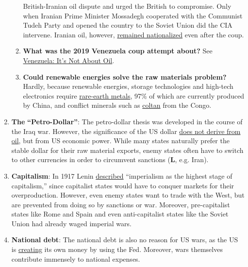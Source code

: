 \begin{enumerate}
\begin{enumerate}
    British-Iranian oil dispute and urged the British to compromise.
    Only when Iranian Prime Minister Mossadegh cooperated with the
    Communist Tudeh Party and opened the country to the Soviet Union did
    the CIA intervene. Iranian oil, however,
    \href{https://www.nationalreview.com/2015/07/what-really-happened-shahs-iran/}{remained
    nationalized} even after the coup.
  \item
    \textbf{What was the 2019 Venezuela coup attempt about?} See
    \href{https://swprs.org/venezuela-its-not-about-the-oil/}{Venezuela:
    It's Not About Oil}.
  \item
    \textbf{Could renewable energies solve the raw materials problem?}
    Hardly, because renewable energies, storage technologies and
    high-tech electronics require
    \href{https://en.wikipedia.org/wiki/Rare-earth_element}{rare-earth
    metals}, 97\% of which are currently produced by China, and conflict
    minerals such as \href{https://en.wikipedia.org/wiki/Coltan}{coltan}
    from the Congo.
  \end{enumerate}
\item
  \textbf{The} \textbf{``Petro-Dollar''}: The petro-dollar thesis was
  developed in the course of the Iraq war. However, the significance of
  the US dollar
  \href{https://foreignpolicy.com/2009/10/07/debunking-the-dumping-the-dollar-conspiracy/}{does
  not derive from oil}, but from US economic power. While many states
  naturally prefer the stable dollar for their raw material exports,
  enemy states often have to switch to other currencies in order to
  circumvent sanctions (\textbf{L}, e.g. Iran).
\item
  \textbf{Capitalism}: In 1917 Lenin
  \href{https://en.wikipedia.org/wiki/Imperialism,_the_Highest_Stage_of_Capitalism}{described}
  ``imperialism as the highest stage of capitalism,'' since capitalist
  states would have to conquer markets for their overproduction.
  However, even enemy states want to trade with the West, but are
  prevented from doing so by sanctions or war. Moreover, pre-capitalist
  states like Rome and Spain and even anti-capitalist states like the
  Soviet Union had already waged imperial wars.
\item
  \textbf{National debt}: The national debt is also no reason for US
  wars, as the US is
  \href{https://www.investopedia.com/articles/investing/081415/understanding-how-federal-reserve-creates-money.asp}{creating}
  its own money by using the Fed. Moreover, wars themselves contribute
  immensely to national expenses.

\end{enumerate}
